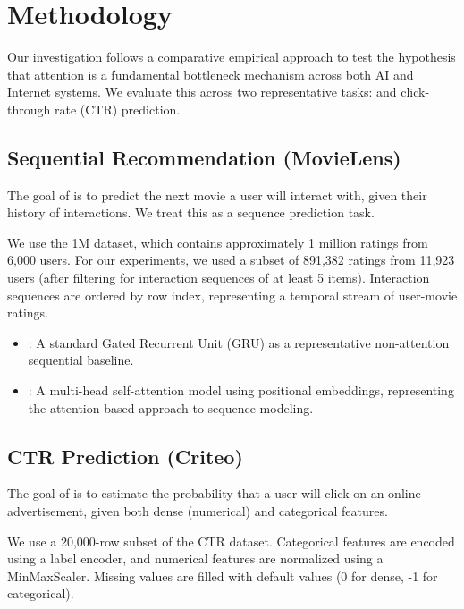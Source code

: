 \section{Methodology}
\label{sec:methodology}

Our investigation follows a comparative empirical approach to test the hypothesis that attention is a fundamental bottleneck mechanism across both AI and Internet systems. We evaluate this across two representative tasks: \sectask and click-through rate (CTR) prediction.

\subsection{Sequential Recommendation (MovieLens)}
The goal of \sectask is to predict the next movie a user will interact with, given their history of interactions. We treat this as a sequence prediction task.

We use the \movielens 1M dataset, which contains approximately 1 million ratings from 6,000 users. For our experiments, we used a subset of 891,382 ratings from 11,923 users (after filtering for interaction sequences of at least 5 items). Interaction sequences are ordered by row index, representing a temporal stream of user-movie ratings.

\begin{itemize}[leftmargin=*,itemsep=0pt,topsep=0pt]
    \item \grumodel: A standard Gated Recurrent Unit (GRU) as a representative non-attention sequential baseline.
    \item \transformer: A multi-head self-attention model using positional embeddings, representing the attention-based approach to sequence modeling.
\end{itemize}

\subsection{CTR Prediction (Criteo)}
The goal of \ctrtask is to estimate the probability that a user will click on an online advertisement, given both dense (numerical) and categorical features.

We use a 20,000-row subset of the \criteo CTR dataset. Categorical features are encoded using a label encoder, and numerical features are normalized using a MinMaxScaler. Missing values are filled with default values (0 for dense, -1 for categorical).

